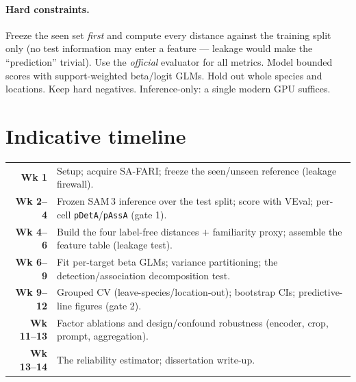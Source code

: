 \documentclass[11pt]{article}
\begin{document}
\paragraph{Hard constraints.} Freeze the seen set \emph{first} and compute every distance against the
training split only (no test information may enter a feature --- leakage would make the ``prediction''
trivial). Use the \emph{official} evaluator for all metrics. Model bounded scores with support-weighted
beta/logit GLMs. Hold out whole species and locations. Keep hard negatives. Inference-only: a single
modern GPU suffices.

\section*{Indicative timeline}
\noindent
\begin{tabular}{@{}rl@{}}
\textbf{Wk 1}     & Setup; acquire SA-FARI; freeze the seen/unseen reference (leakage firewall).\\
\textbf{Wk 2--4}  & Frozen SAM\,3 inference over the test split; score with VEval; per-cell \texttt{pDetA}/\texttt{pAssA} (gate 1).\\
\textbf{Wk 4--6}  & Build the four label-free distances $+$ familiarity proxy; assemble the feature table (leakage test).\\
\textbf{Wk 6--9}  & Fit per-target beta GLMs; variance partitioning; the detection/association decomposition test.\\
\textbf{Wk 9--12} & Grouped CV (leave-species/location-out); bootstrap CIs; predictive-line figures (gate 2).\\
\textbf{Wk 11--13}& Factor ablations and design/confound robustness (encoder, crop, prompt, aggregation).\\
\textbf{Wk 13--14}& The reliability estimator; dissertation write-up.\\
\end{tabular}
\end{document}
